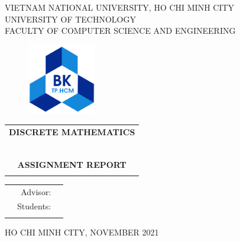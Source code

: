 \documentclass[a4paper]{article}
\begin{document}
\begin{titlepage}
	\begin{center}
		VIETNAM NATIONAL UNIVERSITY, HO CHI MINH CITY \\
		UNIVERSITY OF TECHNOLOGY \\
		FACULTY OF COMPUTER SCIENCE AND ENGINEERING
	\end{center}

	\vspace{1cm}

	\begin{figure}[h!]
		\begin{center}
			\includegraphics[width=3cm]{hcmut.png}
		\end{center}
	\end{figure}

	\vspace{1cm}


	\begin{center}
		\begin{tabular}{c}
			\multicolumn{1}{c}{\textbf{{\Large DISCRETE MATHEMATICS }}} \\
			~~                                                                   \\
			\hline
			\\
			\textbf{{\Huge ASSIGNMENT REPORT}}                               \\
			\\
			\hline
		\end{tabular}
	\end{center}

	\vspace{2cm}

	\begin{table}[h]
		\begin{tabular}{rrl}
			\hspace{5 cm} & Advisor:  &          \\
			              & Students: &  \\
			              &           &         \\
		\end{tabular}
	\end{table}

	\begin{center}
		{\footnotesize HO CHI MINH CITY, NOVEMBER 2021}
	\end{center}
\end{titlepage}
\end{document}
